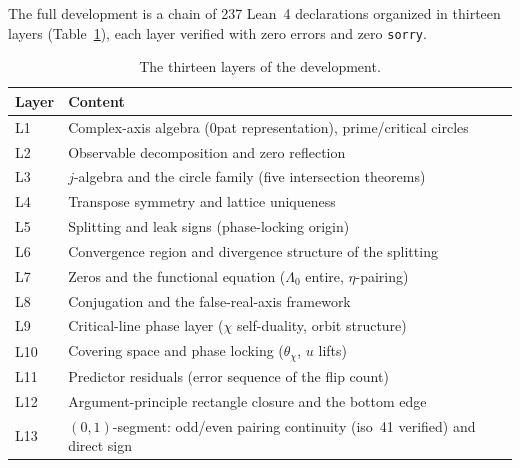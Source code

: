 \documentclass{article}
\newcommand{\Lam}{\Lambda}
\newcommand{\Xchi}{\chi}
\begin{document}
The full development is a chain of 237 Lean~4 declarations organized in
thirteen layers (Table~\ref{tab:layers}), each layer verified with zero
errors and zero \texttt{sorry}.

\begin{table}[h]
\centering
\caption{The thirteen layers of the development.}
\label{tab:layers}
\begin{tabular}{ll}
\hline
Layer & Content \\
\hline
L1 & Complex-axis algebra (0pat representation), prime/critical circles \\
L2 & Observable decomposition and zero reflection \\
L3 & $j$-algebra and the circle family (five intersection theorems) \\
L4 & Transpose symmetry and lattice uniqueness \\
L5 & Splitting and leak signs (phase-locking origin) \\
L6 & Convergence region and divergence structure of the splitting \\
L7 & Zeros and the functional equation ($\Lam_0$ entire, $\eta$-pairing) \\
L8 & Conjugation and the false-real-axis framework \\
L9 & Critical-line phase layer ($\Xchi$ self-duality, orbit structure) \\
L10 & Covering space and phase locking ($\theta_\Xchi$, $u$ lifts) \\
L11 & Predictor residuals (error sequence of the flip count) \\
L12 & Argument-principle rectangle closure and the bottom edge \\
L13 & $(0,1)$-segment: odd/even pairing continuity (iso~41 verified) and direct sign \\
\hline
\end{tabular}
\end{table}
\end{document}
